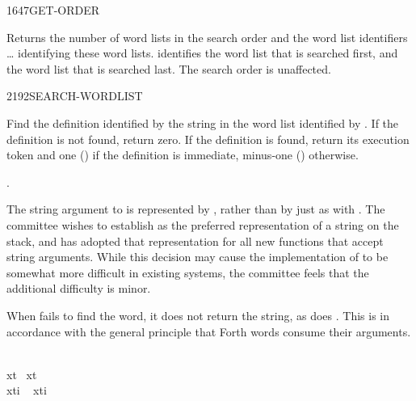 \begin{worddef}{1647}{GET-ORDER}
\item {}

	Returns the number of word lists  in the search order
	and the word list identifiers  {\ldots} 
	identifying these word lists.  identifies the word
	list that is searched first, and  the word list that
	is searched last. The search order is unaffected.
\end{worddef}


\begin{worddef}{2192}{SEARCH-WORDLIST}
\item {}

	Find the definition identified by the string  in
	the word list identified by . If the definition is not
	found, return zero. If the definition is found, return its
	execution token  and one () if the definition is
	immediate, minus-one () otherwise.

\see {}.

	\begin{rationale} %
		The string argument to  is represented
		by , rather than by just  as
		with . The committee wishes to establish
		 as the preferred representation of a string
		on the stack, and has adopted that representation for all new
		functions that accept string arguments. While this decision
		may cause the implementation of  to be
		somewhat more difficult in existing systems, the committee
		feels that the additional difficulty is minor.

		When  fails to find the word, it does
		not return the string, as does . This is in
		accordance with the general principle that Forth words consume
		their arguments.
	\end{rationale}

	\begin{testing}\ttfamily
		   \\
		 xt~   xt~ \word{!} \\
		 xti  ~ xti \word{!}  

		 \\
		 \\
	\end{testing}
\end{worddef}


